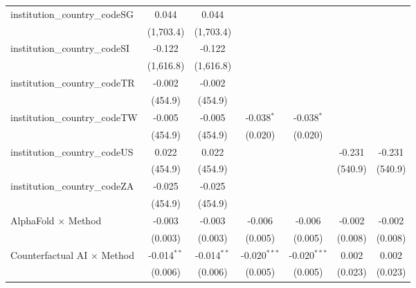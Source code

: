 \begin{tabular}{lcccccc}
   institution\_country\_codeSG          & 0.044         & 0.044         &                &                &           &   \\   
                                         & (1,703.4)     & (1,703.4)     &                &                &           &   \\   
   institution\_country\_codeSI          & -0.122        & -0.122        &                &                &           &   \\   
                                         & (1,616.8)     & (1,616.8)     &                &                &           &   \\   
   institution\_country\_codeTR          & -0.002        & -0.002        &                &                &           &   \\   
                                         & (454.9)       & (454.9)       &                &                &           &   \\   
   institution\_country\_codeTW          & -0.005        & -0.005        & -0.038$^{*}$   & -0.038$^{*}$   &           &   \\   
                                         & (454.9)       & (454.9)       & (0.020)        & (0.020)        &           &   \\   
   institution\_country\_codeUS          & 0.022         & 0.022         &                &                & -0.231    & -0.231\\   
                                         & (454.9)       & (454.9)       &                &                & (540.9)   & (540.9)\\   
   institution\_country\_codeZA          & -0.025        & -0.025        &                &                &           &   \\   
                                         & (454.9)       & (454.9)       &                &                &           &   \\   
   AlphaFold $\times$ Method             & -0.003        & -0.003        & -0.006         & -0.006         & -0.002    & -0.002\\   
                                         & (0.003)       & (0.003)       & (0.005)        & (0.005)        & (0.008)   & (0.008)\\   
   Counterfactual AI $\times$ Method     & -0.014$^{**}$ & -0.014$^{**}$ & -0.020$^{***}$ & -0.020$^{***}$ & 0.002     & 0.002\\   
                                         & (0.006)       & (0.006)       & (0.005)        & (0.005)        & (0.023)   & (0.023)\\   

\end{tabular}
